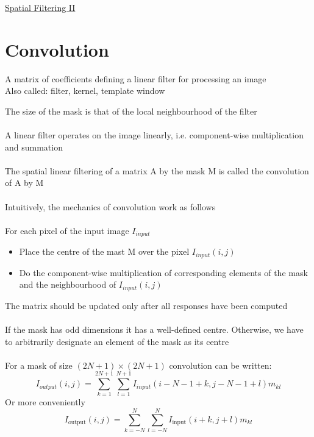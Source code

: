 \documentclass{article}[18pt]
\begin{document}
\begin{center}
\underline{\huge Spatial Filtering II}
\end{center}
\section{Convolution}
\begin{defin}[Mask]
A matrix of coefficients defining a linear filter for processing an image\\
Also called: filter, kernel, template window
\end{defin}
The size of the mask is that of the local neighbourhood of the filter\\
\\
A linear filter operates on the image linearly, i.e. component-wise multiplication and summation\\
\\
The spatial linear filtering of a matrix A by the mask M is called the convolution of A by M\\
\\
Intuitively, the mechanics of convolution work as follows\\
\\
For each pixel of the input image $I_{input}$
\begin{itemize}
	\item Place the centre of the mast M over the pixel $I_{input}(i,j)$
	\item Do the component-wise multiplication of corresponding elements of the mask and the neighbourhood of $I_{input} (i,j)$
\end{itemize} 
The matrix should be updated only after all responses have been computed\\
\\
If the mask has odd dimensions it has a well-defined centre. Otherwise, we have to arbitrarily designate an element of the mask as its centre\\
\\
For a mask of size $(2N+1)\times (2N+1)$ convolution can be written:
\[
I_{o u t p u t}(i, j)=\sum_{k=1}^{2 N+1} \sum_{l=1}^{N+1} I_{i n p u t}(i-N-1+k, j-N-1+l) m_{k l}
\]
Or more conveniently
\[
I_{\text {output}}(i, j)=\sum_{k=-N}^{N} \sum_{l=-N}^{N} I_{\text {input}}(i+k, j+l) m_{k l}
\]
\end{document}
